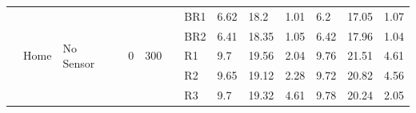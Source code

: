 {\begin{minipage}{\linewidth}
\begin{tabular}{l|l|l|l|c|c|r|l|lll|lll}
  \cline{2-3}\cline{5-6}\cline{8-14}
                                              & \multirow{16}{*}{Home}                   & \multirow{8}{*}{No Sensor}                &                                           & \multirow{8}{*}{0}                         & \multirow{16}{*}{300}                                                                   & \multicolumn{1}{c|}{}                                                                          & BR1                                       & 6.62  & 18.2  & 1.01      & 6.2   & 17.05 & 1.07       \\
                                              &                                          &                                           &                                           &                                            &                                                                                         & \multicolumn{1}{c|}{}                                                                          & BR2                                       & 6.41  & 18.35 & 1.05      & 6.42  & 17.96 & 1.04       \\
                                              &                                          &                                           &                                           &                                            &                                                                                         & \multicolumn{1}{c|}{}                                                                          & R1                                        & 9.7   & 19.56 & 2.04      & 9.76  & 21.51 & 4.61       \\
                                              &                                          &                                           &                                           &                                            &                                                                                         & \multicolumn{1}{c|}{}                                                                          & R2                                        & 9.65  & 19.12 & 2.28      & 9.72  & 20.82 & 4.56       \\
                                              &                                          &                                           &                                           &                                            &                                                                                         & \multicolumn{1}{c|}{}                                                                          & R3                                        & 9.7   & 19.32 & 4.61      & 9.78  & 20.24 & 2.05       \\

\end{tabular}
\end{minipage}}
